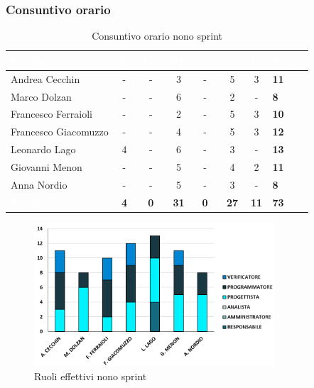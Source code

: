 \subsubsection{Consuntivo orario}
{
\setlength{\tabcolsep}{10pt}
\renewcommand{\arraystretch}{1.5}
\begin{table}[h!]
    \centering
    \begin{tabularx}{\textwidth}{| l | c | c | c | c | c | c | X |}
        \hline
        \rowcolor{headerrow} \textbf{\textcolor{white}{Membro}} & \textbf{\textcolor{white}{R.}} & \textbf{\textcolor{white}{Am.}} & \textbf{\textcolor{white}{Pj.}} & \textbf{\textcolor{white}{An.}} & \textbf{\textcolor{white}{Pg.}} & \textbf{\textcolor{white}{V.}} & \textbf{\textcolor{white}{Totale}} \\
        \hline
        Andrea Cecchin & - & - & 3 & - & 5 & 3 & \textbf{11} \\
        \hline
        Marco Dolzan & - & - & 6 & - & 2 & - & \textbf{8} \\
        \hline
        Francesco Ferraioli & - & - & 2 & - & 5 & 3 & \textbf{10} \\
        \hline  
        Francesco Giacomuzzo & - & - & 4 & - & 5 & 3 & \textbf{12} \\
        \hline
        Leonardo Lago & 4 & - & 6 & - & 3 & - & \textbf{13} \\
        \hline
        Giovanni Menon & - & - & 5 & - & 4 & 2 & \textbf{11} \\
        \hline
        Anna Nordio & - & - & 5 & - & 3 & - & \textbf{8} \\
        \hline
    \cellcolor{headerrow} \textbf{\textcolor{white}{Totale}} & \textbf{4} & \textbf{0} & \textbf{31} & \textbf{0} & \textbf{27} & \textbf{11} & \textbf{73} \\
        \hline
    \end{tabularx} 
    \caption{Consuntivo orario nono sprint}
    \label{tab:consuntivoorariononosprint}
\end{table}
}

\begin{figure}[h!]
    \centering
    \includegraphics[width=0.8\textwidth]{cons9ruoli.png}
    \caption{Ruoli effettivi nono sprint}
    \label{fig:consuntivoorariononosprint}
\end{figure}

